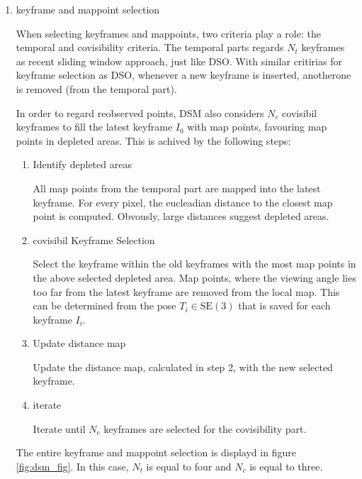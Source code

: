 	\begin{enumerate}
	\item{keyframe and mappoint selection}
	
	When selecting keyframes and mappoints, two criteria play a role: the temporal and covisibility criteria. 
	The temporal parts regards $N_t$ keyframes as recent sliding window approach, just like DSO. With similar 
	critirias for keyframe selection as DSO, whenever a new keyframe is inserted, anotherone is removed (from the temporal part).

	In order to regard reobserved points, DSM also considers $N_c$ covisibil keyframes to fill the latest keyframe $I_0$ with map points, favouring 
	map points in depleted areas. This is achived by the following steps: 
	
	\begin{enumerate}
	\item{Identify depleted areas}
	
	All map points from the temporal part are mapped into the latest keyframe. For every pixel, the eucleadian distance to the closest map point 
	is computed. Obvously, large distances suggest depleted areas.
	
	\item{covisibil Keyframe Selection}
	
	Select the keyframe within the old keyframes with the most map points in the above selected depleted area. Map points, where the viewing angle 
	lies too far from the latest keyframe are removed from the local map. 
	This can be determined from the pose $T_i \in \text{SE}(3)$ that is saved for each keyframe $I_i$. 
	
	\item{Update distance map}
	
	Update the distance map, calculated in step 2, with the new selected keyframe. 
	
	\item{iterate}
	
	Iterate until $N_c$ keyframes are selected for the covisibility part. 
	
	\end{enumerate}
	
	The entire keyframe and mappoint selection is displayd in figure \ref{fig:dsm_fig}. In this case, $N_t$ is equal to four and $N_c$ is equal to three.
	
	

\end{enumerate}
